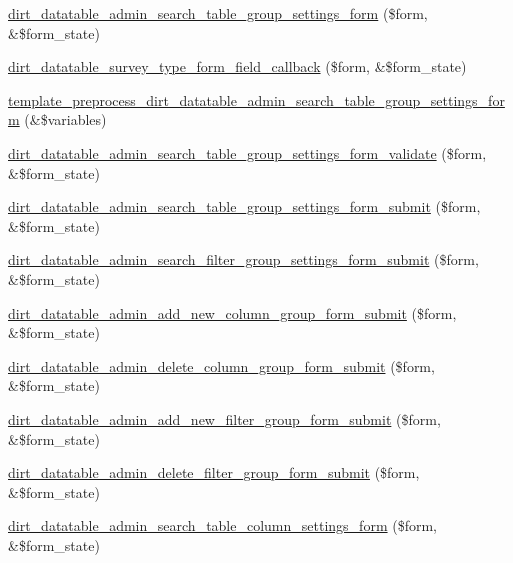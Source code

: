 \begin{DoxyCompactItemize}
\item 
\mbox{\hyperlink{dirt__datatable_8admin_8inc_a1f26f738efd87bea25d2808e4365422d}{dirt\+\_\+datatable\+\_\+admin\+\_\+search\+\_\+table\+\_\+group\+\_\+settings\+\_\+form}} (\$form, \&\$form\+\_\+state)
\item 
\mbox{\hyperlink{dirt__datatable_8admin_8inc_ac1b35bd48b6b6a599a9ccd22038f5b93}{dirt\+\_\+datatable\+\_\+survey\+\_\+type\+\_\+form\+\_\+field\+\_\+callback}} (\$form, \&\$form\+\_\+state)
\item 
\mbox{\hyperlink{dirt__datatable_8admin_8inc_ac2bf7c88b2f02e6100d802d1e2f1d7d9}{template\+\_\+preprocess\+\_\+dirt\+\_\+datatable\+\_\+admin\+\_\+search\+\_\+table\+\_\+group\+\_\+settings\+\_\+form}} (\&\$variables)
\item 
\mbox{\hyperlink{dirt__datatable_8admin_8inc_a8ef005763dfab5e8c21f0a23f142a689}{dirt\+\_\+datatable\+\_\+admin\+\_\+search\+\_\+table\+\_\+group\+\_\+settings\+\_\+form\+\_\+validate}} (\$form, \&\$form\+\_\+state)
\item 
\mbox{\hyperlink{dirt__datatable_8admin_8inc_a1b7863f55a25dcbd42c3f11286bd278b}{dirt\+\_\+datatable\+\_\+admin\+\_\+search\+\_\+table\+\_\+group\+\_\+settings\+\_\+form\+\_\+submit}} (\$form, \&\$form\+\_\+state)
\item 
\mbox{\hyperlink{dirt__datatable_8admin_8inc_a7bfff358bb98c09a0ec4b53460ec520a}{dirt\+\_\+datatable\+\_\+admin\+\_\+search\+\_\+filter\+\_\+group\+\_\+settings\+\_\+form\+\_\+submit}} (\$form, \&\$form\+\_\+state)
\item 
\mbox{\hyperlink{dirt__datatable_8admin_8inc_a43b518622a9dcd3f56b93756f31066fe}{dirt\+\_\+datatable\+\_\+admin\+\_\+add\+\_\+new\+\_\+column\+\_\+group\+\_\+form\+\_\+submit}} (\$form, \&\$form\+\_\+state)
\item 
\mbox{\hyperlink{dirt__datatable_8admin_8inc_abdd12777e016a94776d5f00cf7570371}{dirt\+\_\+datatable\+\_\+admin\+\_\+delete\+\_\+column\+\_\+group\+\_\+form\+\_\+submit}} (\$form, \&\$form\+\_\+state)
\item 
\mbox{\hyperlink{dirt__datatable_8admin_8inc_a38374d6a58b8ff455cb797c2580e8481}{dirt\+\_\+datatable\+\_\+admin\+\_\+add\+\_\+new\+\_\+filter\+\_\+group\+\_\+form\+\_\+submit}} (\$form, \&\$form\+\_\+state)
\item 
\mbox{\hyperlink{dirt__datatable_8admin_8inc_a93647ab21b4b4970c4d027a3f675c635}{dirt\+\_\+datatable\+\_\+admin\+\_\+delete\+\_\+filter\+\_\+group\+\_\+form\+\_\+submit}} (\$form, \&\$form\+\_\+state)
\item 
\mbox{\hyperlink{dirt__datatable_8admin_8inc_a4a8e0dbb0fdbf4b851697d2d1f2867ae}{dirt\+\_\+datatable\+\_\+admin\+\_\+search\+\_\+table\+\_\+column\+\_\+settings\+\_\+form}} (\$form, \&\$form\+\_\+state)

\end{DoxyCompactItemize}
